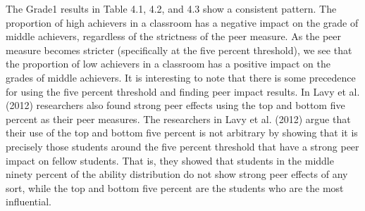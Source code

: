 The Grade1 results in Table 4.1, 4.2, and 4.3 show a consistent pattern. 
The proportion of high achievers in a classroom has a negative impact on the grade of middle achievers, regardless of the strictness of the peer measure. 
As the peer measure becomes stricter (specifically at the five percent threshold), we see that the proportion of low achievers in a classroom has a positive impact on the grades of middle achievers. 
It is interesting to note that there is some precedence for using the five percent threshold and finding peer impact results. 
In Lavy et al. (2012) researchers also found strong peer effects using the top and bottom five percent as their peer measures. 
The researchers in Lavy et al. (2012) argue that their use of the top and bottom five percent is not arbitrary by showing that it is precisely those students around the five percent threshold that have a strong peer impact on fellow students. 
That is, they showed that students in the middle ninety percent of the ability distribution do not show strong peer effects of any sort, while the top and bottom five percent are the students who are the most influential. 

